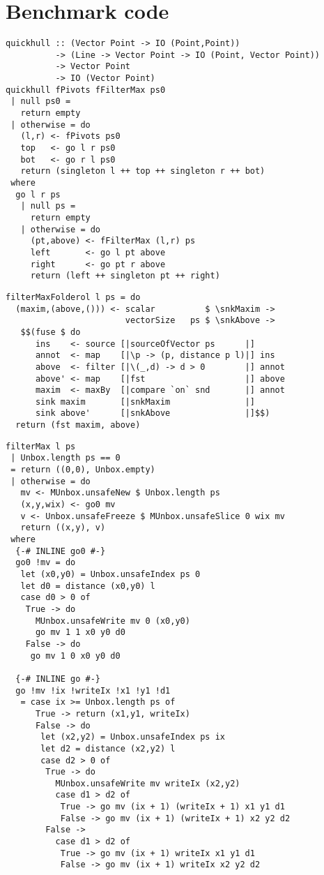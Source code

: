 \chapter{Benchmark code}
\label{app:Benchmarks}

\begin{lstlisting}[float,label=l:a:bench:quickhull,caption=Quickhull skeleton parameterised by filterMax and pivots]
quickhull :: (Vector Point -> IO (Point,Point))
          -> (Line -> Vector Point -> IO (Point, Vector Point))
          -> Vector Point
          -> IO (Vector Point)
quickhull fPivots fFilterMax ps0
 | null ps0 =
   return empty
 | otherwise = do
   (l,r) <- fPivots ps0
   top   <- go l r ps0
   bot   <- go r l ps0
   return (singleton l ++ top ++ singleton r ++ bot)
 where
  go l r ps
   | null ps =
     return empty
   | otherwise = do
     (pt,above) <- fFilterMax (l,r) ps
     left       <- go l pt above
     right      <- go pt r above
     return (left ++ singleton pt ++ right)
\end{lstlisting}

\begin{lstlisting}[float,label=l:a:bench:filterMaxFolderol,caption=Folderol implementation of filterMax]
filterMaxFolderol l ps = do
  (maxim,(above,())) <- scalar          $ \snkMaxim ->
                        vectorSize   ps $ \snkAbove ->
   $$(fuse $ do
      ins    <- source [|sourceOfVector ps      |]
      annot  <- map    [|\p -> (p, distance p l)|] ins
      above  <- filter [|\(_,d) -> d > 0        |] annot
      above' <- map    [|fst                    |] above
      maxim  <- maxBy  [|compare `on` snd       |] annot
      sink maxim       [|snkMaxim               |]
      sink above'      [|snkAbove               |]$$)
  return (fst maxim, above)
\end{lstlisting}

\begin{lstlisting}[float,label=l:a:bench:filterMaxHand,caption=Hand-fused implementation of filterMax]
filterMax l ps
 | Unbox.length ps == 0
 = return ((0,0), Unbox.empty)
 | otherwise = do
   mv <- MUnbox.unsafeNew $ Unbox.length ps
   (x,y,wix) <- go0 mv
   v <- Unbox.unsafeFreeze $ MUnbox.unsafeSlice 0 wix mv
   return ((x,y), v)
 where
  {-# INLINE go0 #-}
  go0 !mv = do
   let (x0,y0) = Unbox.unsafeIndex ps 0
   let d0 = distance (x0,y0) l
   case d0 > 0 of
    True -> do
      MUnbox.unsafeWrite mv 0 (x0,y0)
      go mv 1 1 x0 y0 d0
    False -> do
     go mv 1 0 x0 y0 d0

  {-# INLINE go #-}
  go !mv !ix !writeIx !x1 !y1 !d1
   = case ix >= Unbox.length ps of
      True -> return (x1,y1, writeIx)
      False -> do
       let (x2,y2) = Unbox.unsafeIndex ps ix
       let d2 = distance (x2,y2) l
       case d2 > 0 of
        True -> do
          MUnbox.unsafeWrite mv writeIx (x2,y2)
          case d1 > d2 of
           True -> go mv (ix + 1) (writeIx + 1) x1 y1 d1
           False -> go mv (ix + 1) (writeIx + 1) x2 y2 d2
        False ->
          case d1 > d2 of
           True -> go mv (ix + 1) writeIx x1 y1 d1
           False -> go mv (ix + 1) writeIx x2 y2 d2
\end{lstlisting}

